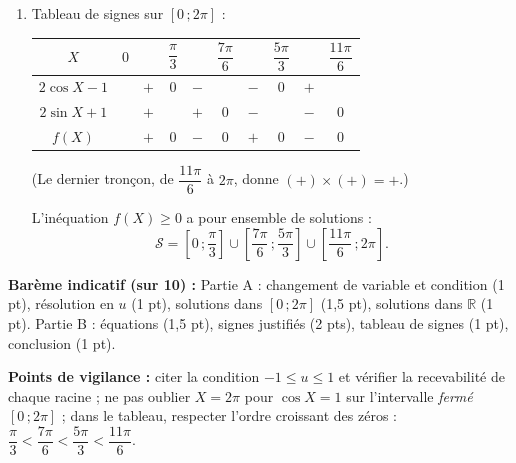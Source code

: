 \documentclass[11pt]{article}
\begin{document}
\begin{corrige}
\begin{enumerate}
Ces conclusions sont licites grâce à la propriété admise : chaque facteur ne s'annulant qu'aux points trouvés, il garde un signe constant sur chaque intervalle intermédiaire.
\item Tableau de signes sur $[0\,;2\pi]$ :
\begin{center}
\begin{tabular}{|c|ccccccccc|}\hline
$X$ & $0$ & & $\dfrac{\pi}{3}$ & & $\dfrac{7\pi}{6}$ & & $\dfrac{5\pi}{3}$ & & $\dfrac{11\pi}{6}$ \\ \hline
$2\cos X-1$ & & $+$ & $0$ & $-$ & & $-$ & $0$ & $+$ & \\ \hline
$2\sin X+1$ & & $+$ & & $+$ & $0$ & $-$ & & $-$ & $0$ \\ \hline
$f(X)$ & & $+$ & $0$ & $-$ & $0$ & $+$ & $0$ & $-$ & $0$ \\ \hline
\end{tabular}
\end{center}
(Le dernier tronçon, de $\dfrac{11\pi}{6}$ à $2\pi$, donne $(+)\times(+)=+$.)

L'inéquation $f(X)\geq 0$ a pour ensemble de solutions :
\[\mathcal{S}=\left[0\,;\dfrac{\pi}{3}\right]\cup\left[\dfrac{7\pi}{6}\,;\dfrac{5\pi}{3}\right]\cup\left[\dfrac{11\pi}{6}\,;2\pi\right].\]
\end{enumerate}
\textbf{Barème indicatif (sur 10) :} Partie A : changement de variable et condition (1 pt), résolution en $u$ (1 pt), solutions dans $[0\,;2\pi]$ (1,5 pt), solutions dans $\mathbb{R}$ (1 pt). Partie B : équations (1,5 pt), signes justifiés (2 pts), tableau de signes (1 pt), conclusion (1 pt).

\textbf{Points de vigilance :} citer la condition $-1\leq u\leq 1$ et vérifier la recevabilité de chaque racine ; ne pas oublier $X=2\pi$ pour $\cos X=1$ sur l'intervalle \emph{fermé} $[0\,;2\pi]$ ; dans le tableau, respecter l'ordre croissant des zéros : $\dfrac{\pi}{3}<\dfrac{7\pi}{6}<\dfrac{5\pi}{3}<\dfrac{11\pi}{6}$.
\end{corrige}
\end{document}
